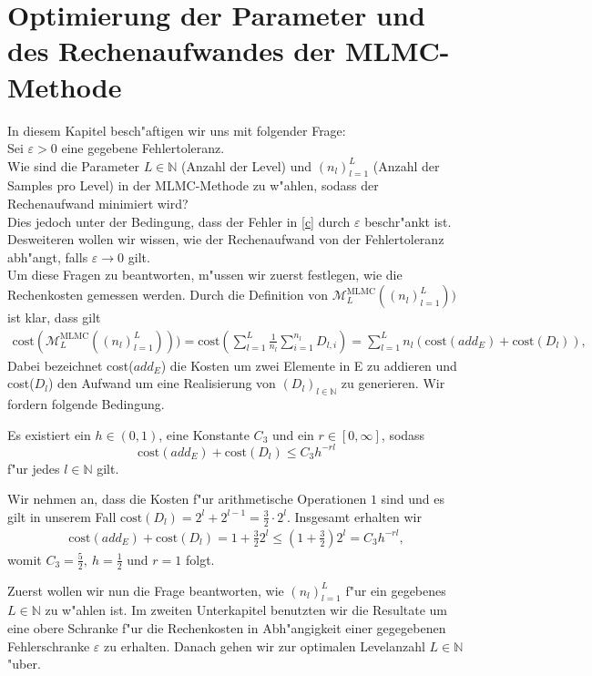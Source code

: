 \section{Optimierung der Parameter und des Rechenaufwandes der MLMC-Methode}
In diesem Kapitel besch"aftigen wir uns mit folgender Frage:\\
Sei $\varepsilon>0$ eine gegebene Fehlertoleranz.\\ Wie sind die Parameter $L\in \mathbb{N}$ (Anzahl der Level) und $(n_l)^L_{l=1}$ (Anzahl der Samples pro Level) in der MLMC-Methode zu w"ahlen, sodass der Rechenaufwand minimiert wird?\\
 Dies jedoch unter der Bedingung, dass der Fehler in \eqref{c} durch $\varepsilon$ beschr"ankt ist.\\
 Desweiteren wollen wir wissen, wie der Rechenaufwand von der Fehlertoleranz abh"angt, falls $\varepsilon\rightarrow 0$ gilt.\\
 Um diese Fragen zu beantworten, m"ussen wir zuerst festlegen, wie die Rechenkosten gemessen werden. Durch die Definition von 
 $\mathcal{M}_L^{\text{MLMC}}((n_l)_{l=1}^L))$ ist klar, dass gilt
 \begin{align*}
 \text{cost}(\mathcal{M}_L^{\text{MLMC}}((n_l)_{l=1}^L)))=\text{cost}\left(\sum_{l=1}^L\frac{1}{n_l}\sum_{i=1}^{n_l}D_{l,i}\right)=\sum_{l=1}^Ln_l(\text{cost}(add_E)+\text{cost}(D_l)),
 \end{align*}
 Dabei bezeichnet cost($add_E$) die Kosten um zwei Elemente in E zu addieren und cost($D_l$) den Aufwand um eine Realisierung von $(D_l)_{l\in\mathbb{N}}$ zu generieren. Wir fordern folgende Bedingung.
 \begin{vor}\label{v}
 Es existiert ein $h\in(0,1)$, eine Konstante $C_3$ und ein $r\in[0,\infty]$, sodass 
 \begin{equation*}
 \text{cost}(add_E)+\text{cost}(D_l)\leq C_3h^{-rl}
 \end{equation*}
 f"ur jedes $l\in\mathbb{N}$ gilt.
 \end{vor}
Wir nehmen an, dass die Kosten f"ur arithmetische Operationen $1$ sind und es gilt in unserem Fall $\text{cost}(D_l)=2^l+2^{l-1}=\frac{3}{2}\cdot 2^l$. Insgesamt erhalten wir
\begin{align*}
 \text{cost}(add_E)+\text{cost}(D_l)=1+\frac{3}{2}2^l\leq (1+\frac{3}{2})2^l= C_3h^{-rl},
\end{align*}
womit $ C_3=\frac{5}{2}, \ h=\frac{1}{2}$ und $ r=1$ folgt.\\[0,2cm] \label{cost}

Zuerst wollen wir nun die Frage beantworten, wie $(n_l)_{l=1}^L$ f"ur ein gegebenes $L\in \mathbb{N}$ zu w"ahlen ist. Im zweiten Unterkapitel benutzten wir die Resultate um eine obere Schranke f"ur die Rechenkosten in Abh"angigkeit einer gegegebenen Fehlerschranke $\varepsilon$ zu erhalten. Danach gehen wir zur optimalen Levelanzahl $L\in\mathbb{N}$ "uber.